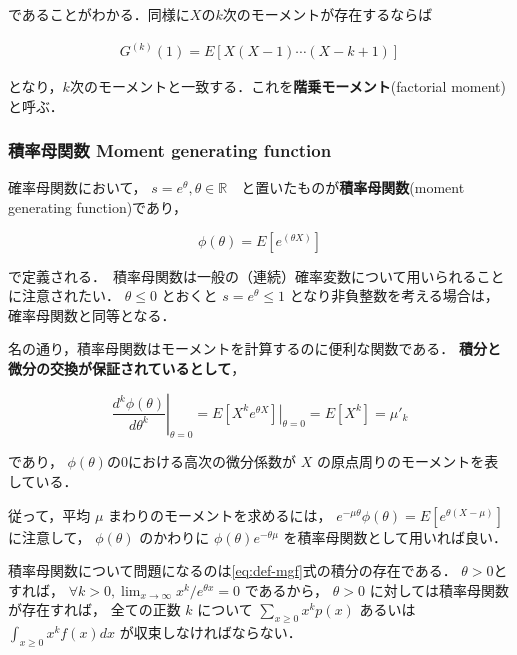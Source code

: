 \documentclass[12pt,a4j,draft]{jarticle}
\numberwithin{equation}{section}
\theoremstyle{break}
\newcommand{\R}{\mathbb R}
\begin{document}
であることがわかる．同様に$X$の$k$次のモーメントが存在するならば

\begin{align}
    G^{(k)}(1) = E[X(X-1)\cdots (X-k+1)]
\end{align}

となり，$k$次のモーメントと一致する．これを\textbf{階乗モーメント}(factorial moment)と呼ぶ．

\subsubsection{積率母関数 Moment generating function}

確率母関数において， $s=e^\theta, \theta \in \R$　と置いたものが\textbf{積率母関数}(moment generating function)であり，

\begin{equation}
    \label{eq:def-mgf}
    \phi(\theta) = E[e^{(\theta X)}]
\end{equation}

で定義される．　積率母関数は一般の（連続）確率変数について用いられることに注意されたい． $\theta \leq 0$ とおくと $s = e^\theta \leq 1$ となり非負整数を考える場合は，確率母関数と同等となる．

名の通り，積率母関数はモーメントを計算するのに便利な関数である． \textbf{積分と微分の交換が保証されているとして}，

\begin{equation}
    \label{eq:mfg-moment}
    \left. \frac{d^k \phi (\theta)}{d \theta^k} \right |_{\theta=0} = 
    \left. E[X^k e^{\theta X}] \right |_{\theta =0} =
    E[X^k] = \mu'_k
\end{equation}

であり， $\phi(\theta)$の$0$における高次の微分係数が $X$ の原点周りのモーメントを表している．

従って，平均 $\mu$ まわりのモーメントを求めるには， $e^{-\mu \theta} \phi(\theta) = E[e^{\theta(X-\mu)}]$に注意して， $\phi(\theta)$ のかわりに $\phi(\theta) e^{-\theta \mu}$ を積率母関数として用いれば良い．

積率母関数について問題になるのは\eqref{eq:def-mgf}式の積分の存在である． $\theta > 0$とすれば， $\forall k > 0, \displaystyle \lim_{x \rightarrow \infty} x^k / e^{\theta x} = 0$ であるから， $\theta > 0$ に対しては積率母関数が存在すれば， 全ての正数 $k$ について $\displaystyle \sum_{x \geq 0} x^k p(x)$ あるいは $\displaystyle \int_{x \geq 0} x^k f(x) dx$ が収束しなければならない． \\
\end{document}

